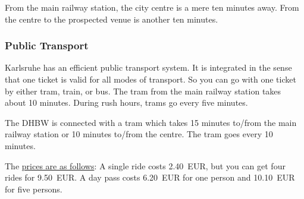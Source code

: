 From the main railway station, the city centre is a mere ten minutes 
away.
From the centre to the prospected venue is another ten minutes.



\subsubsection{Public Transport}

Karlsruhe has an efficient public transport system.
It is integrated in the sense that one ticket is valid
for all modes of transport.
So you can go with one ticket by either tram, train, or bus.
The tram from the main railway station takes about 10 minutes.
During rush hours, trams go every five minutes.

The DHBW is connected with a tram which takes 15 minutes to/from the 
main railway station or 10 minutes to/from the centre.
The tram goes every 10 minutes.

The 
\href{http://www.kvv.de/fahrkarten/fahrkarten-preise/einzelfahrkarten.html}%
{prices are as follows}:
A single ride costs 2.40~EUR, but you can get four rides for 9.50~EUR.
A day pass costs 6.20~EUR for one person and 10.10~EUR for five 
persons.

\newpage
